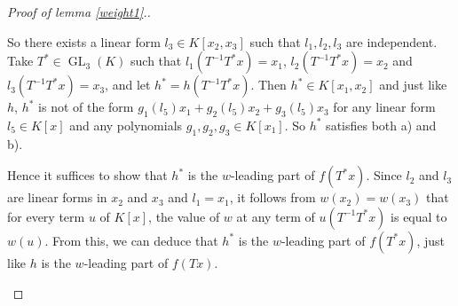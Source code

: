 \documentclass[10pt]{article}
\theoremstyle{remark}
\theoremstyle{definition}
\newcommand{\GL}{\operatorname{GL}}
\begin{document}
\begin{proof}[Proof of lemma \ref{weight1}.]
\begin{enumerate}
So there exists a linear form $l_3 \in K[x_2,x_3]$ such that $l_1, l_2, l_3$ are 
independent. Take $T^{*} \in \GL_3(K)$ such that $l_1(T^{-1}T^{*}x) = x_1$, 
$l_2(T^{-1}T^{*}x) = x_2$ and $l_3(T^{-1}T^{*}x) = x_3$, and let $h^{*} = h(T^{-1}T^{*}x)$. 
Then $h^{*} \in K[x_1,x_2]$ and just like $h$, $h^{*}$ is not of 
the form $g_1(l_5) x_1 + g_2(l_5) x_2 + g_3(l_5)x_3$ for any linear form $l_5 \in K[x]$ 
and any polynomials $g_1, g_2, g_3 \in K[x_1]$. So $h^{*}$ satisfies both a) and b).

Hence it suffices to show that $h^{*}$ is the $w$-leading part of $f(T^{*}x)$.
Since $l_2$ and $l_3$ are linear forms in $x_2$ and $x_3$ and $l_1 = x_1$,
it follows from $w(x_2) = w(x_3)$ that for every term $u$ of $K[x]$,
the value of $w$ at any term of $u(T^{-1}T^{*}x)$ is equal to $w(u)$.
From this, we can deduce that $h^{*}$ is the $w$-leading part of $f(T^{*}x)$, just
like $h$ is the $w$-leading part of $f(Tx)$. \qedhere

\end{enumerate}
\end{proof}
\end{document}
